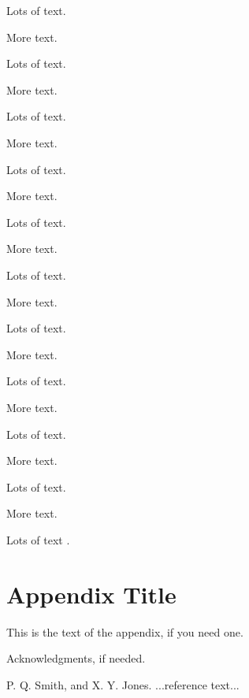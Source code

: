 \documentclass[10pt,nonatbib]{sigplanconf}
\begin{document}
Lots of text.

More text.

Lots of text.

More text.

Lots of text.

More text.

Lots of text.

More text.

Lots of text.

More text.

Lots of text.

More text.

Lots of text.

More text.

Lots of text.

More text.

Lots of text.

More text.

Lots of text.

More text.

Lots of text \cite{smith02}.

\appendix
\section{Appendix Title}

This is the text of the appendix, if you need one.

\acks

Acknowledgments, if needed.





\begin{thebibliography}{}
\softraggedright

P. Q. Smith, and X. Y. Jones. ...reference text...

\end{thebibliography}
\end{document}
